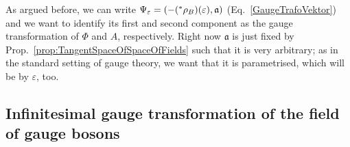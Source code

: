 As argued before, we can write $\Psi_\varepsilon = \mleft( -({}^*\rho_B )(\varepsilon), \mathfrak{a} \mright)$ (Eq.~\eqref{GaugeTrafoVektor}) and we want to identify its first and second component as the gauge transformation of $\Phi$ and $A$, respectively. Right now $\mathfrak{a}$ is just fixed by Prop.~\ref{prop:TangentSpaceOfSpaceOfFields} such that it is very arbitrary; as in the standard setting of gauge theory, we want that it is parametrised, which will be by $\varepsilon$, too.

\subsection{Infinitesimal gauge transformation of the field of gauge bosons}
%
%
